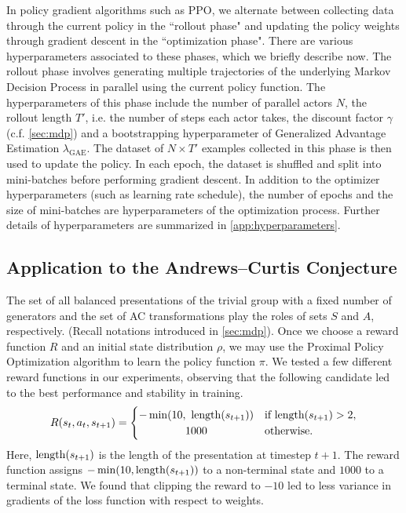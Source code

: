In policy gradient algorithms such as PPO, we alternate between collecting data through the current policy in the ``rollout phase" and updating the policy weights through gradient descent in the ``optimization phase". There are various hyperparameters associated to these phases, which we briefly describe now. The rollout phase involves generating multiple trajectories of the underlying Markov Decision Process in parallel using the current policy function.
The hyperparameters of this phase include the number of parallel actors $N$, the rollout length $T'$, i.e. the number of steps each actor takes, the discount factor $\gamma$ (c.f. \autoref{sec:mdp}) and a bootstrapping hyperparameter of Generalized Advantage Estimation $\lambda_{\text{GAE}}$. The dataset of $N \times T'$ examples collected in this phase is then used to update the policy. In each epoch, the dataset is shuffled and split into mini-batches before performing gradient descent.
In addition to the optimizer hyperparameters (such as learning rate schedule), the number of epochs and the size of mini-batches are hyperparameters of the optimization process.
Further details of hyperparameters are summarized in  \autoref{app:hyperparameters}.

\subsection{Application to the Andrews--Curtis Conjecture}\label{sec:application}

The set of all balanced presentations of the trivial group with a fixed number of generators and the set of AC transformations play the roles of sets $S$ and $A$, respectively. (Recall notations introduced in \autoref{sec:mdp}). Once we choose a reward function $R$ and an initial state distribution $\rho$, we may use the Proximal Policy Optimization algorithm to learn the policy function $\pi$. We tested a few different reward functions in our experiments, observing that the following candidate led to the best performance and stability in training.
\[
R(s_{t}, a_{t}, s_{t+1}) =
\begin{cases}
	-\min(10, \ \length(s_{t+1})) & \text{if length}(s_{t+1}) > 2, \\
	\hfil 1000 & \text{otherwise.}
\end{cases}
\]
Here, $\operatorname{length}(s_{t+1})$ is the length of the presentation at timestep $t+1$. The reward function assigns $-\min(10, \operatorname{length}(s_{t+1}))$ to a non-terminal state and $1000$ to a terminal state. We found that clipping the reward to $-10$ led to less variance in gradients of the loss function with respect to weights.

